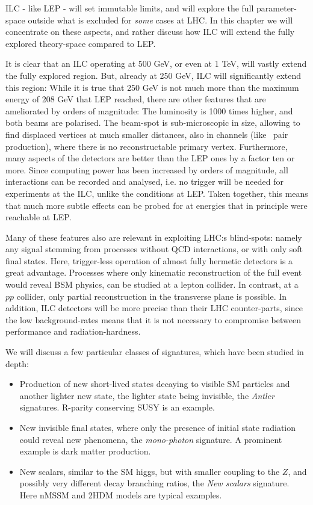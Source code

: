 ILC - like LEP - will set immutable limits, and will explore
the full parameter-space outside what is excluded for {\it some}
cases at LHC. In this chapter we will concentrate on these aspects, and rather
discuss how ILC will extend the fully explored theory-space
compared to LEP.

It is clear that an ILC operating at 500 GeV, or even at 1 TeV,
will vastly extend the fully explored region.
But, already at 250 GeV, ILC will significantly extend this region:
While it is true that 250 GeV is not much more than the maximum 
energy of 208 GeV that LEP reached,
there are other features that are
ameliorated by orders of magnitude: 
The luminosity is 1000 times higher,
and both beams are  polarised.
The beam-spot is sub-microscopic in size, allowing to find 
displaced vertices at much smaller distances, also in channels 
(like \stau~pair production),
where there is no reconstructable primary vertex.
Furthermore, 
many aspects of the detectors are better than the LEP ones by a 
factor ten or more.
Since computing power has been increased by orders of magnitude,
all interactions can be recorded and analysed, 
i.e.
no trigger will be needed for experiments at the ILC, 
unlike the conditions at LEP.
Taken together, this means that much more subtle effects
can be probed for at energies that in principle were reachable at LEP.

Many of these features also are relevant in exploiting LHC:s blind-spots: 
namely any signal stemming from processes without QCD interactions,
or with only soft final states.
Here, trigger-less operation of almost fully hermetic detectors
is a great advantage.
Processes where only kinematic reconstruction of the full event
would reveal BSM physics,
can be studied at a lepton collider. 
In contrast, 
at a $pp$ collider, only partial reconstruction 
in the transverse plane is possible.
In addition,
ILC detectors will be more precise than their LHC counter-parts,
since the low background-rates means that it is not necessary
to compromise between performance and radiation-hardness.

We will discuss a few particular classes of signatures,
which have been studied in depth:
\begin{itemize}
\item Production of new short-lived states decaying to visible
  SM particles and another lighter new state, the lighter
  state being invisible, the {\it Antler} signatures.
  R-parity conserving SUSY is an example.
\item New invisible final states, where only the presence
  of initial state radiation could reveal new phenomena,
  the {\it mono-photon} signature.
  A prominent example is dark matter production.
\item New scalars, similar to the SM higgs, but with smaller
  coupling to the $Z$, and possibly very different decay
  branching ratios, the {\it New scalars} signature.
  Here nMSSM and 2HDM models are typical examples.
\end{itemize}



